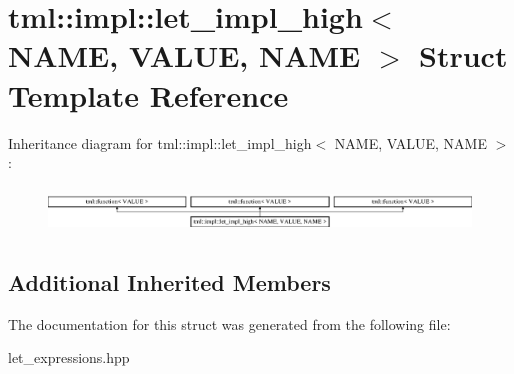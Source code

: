 \hypertarget{structtml_1_1impl_1_1let__impl__high_3_01NAME_00_01VALUE_00_01NAME_01_4}{\section{tml\+:\+:impl\+:\+:let\+\_\+impl\+\_\+high$<$ N\+A\+M\+E, V\+A\+L\+U\+E, N\+A\+M\+E $>$ Struct Template Reference}
\label{structtml_1_1impl_1_1let__impl__high_3_01NAME_00_01VALUE_00_01NAME_01_4}
}
Inheritance diagram for tml\+:\+:impl\+:\+:let\+\_\+impl\+\_\+high$<$ N\+A\+M\+E, V\+A\+L\+U\+E, N\+A\+M\+E $>$\+:\begin{figure}[H]
\begin{center}
\leavevmode
\includegraphics[height=1.248607cm]{structtml_1_1impl_1_1let__impl__high_3_01NAME_00_01VALUE_00_01NAME_01_4}
\end{center}
\end{figure}
\subsection*{Additional Inherited Members}


The documentation for this struct was generated from the following file\+:\begin{DoxyCompactItemize}
\item 
let\+\_\+expressions.\+hpp\end{DoxyCompactItemize}
